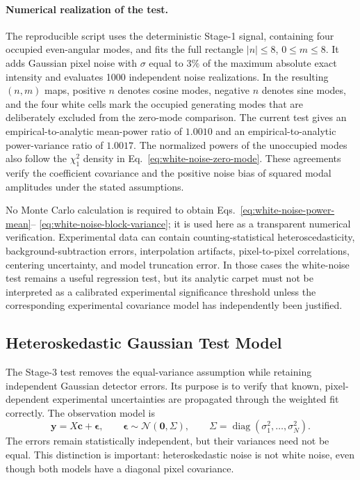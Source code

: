 \documentclass[aps,prb,preprint,onecolumn,notitlepage,amsmath,amssymb,
  superscriptaddress,floatfix]{revtex4-2}
\begin{document}
\paragraph{Numerical realization of the test.}
The reproducible script
 uses the deterministic
Stage-1 signal, containing four occupied even-angular modes, and fits the full
rectangle $|n|\leq8$, $0\leq m\leq8$.  It adds Gaussian pixel noise with
$\sigma$ equal to $3\%$ of the maximum absolute exact intensity and evaluates
1000 independent noise realizations.  In the resulting $(n,m)$ maps, positive
$n$ denotes cosine modes, negative $n$ denotes sine modes, and the four white
cells mark the occupied generating modes that are deliberately excluded from
the zero-mode comparison.  The current test gives an empirical-to-analytic
mean-power ratio of $1.0010$ and an empirical-to-analytic power-variance ratio
of $1.0017$.  The normalized powers of the unoccupied modes also follow the
$\chi_1^2$ density in Eq.~\eqref{eq:white-noise-zero-mode}.  These agreements
verify the coefficient covariance and the positive noise bias of squared
modal amplitudes under the stated assumptions.

No Monte Carlo calculation is required to obtain Eqs.~\eqref{eq:white-noise-power-mean}--
\eqref{eq:white-noise-block-variance}; it is used here as a transparent
numerical verification.  Experimental data can contain counting-statistical
heteroscedasticity, background-subtraction errors, interpolation artifacts,
pixel-to-pixel correlations, centering uncertainty, and model truncation
error.  In those cases the white-noise test remains a useful regression test,
but its analytic carpet must not be interpreted as a calibrated experimental
significance threshold unless the corresponding experimental covariance
model has independently been justified.

\subsection{Heteroskedastic Gaussian Test Model}

The Stage-3 test removes the equal-variance assumption while retaining
independent Gaussian detector errors.  Its purpose is to verify that known,
pixel-dependent experimental uncertainties are propagated through the
weighted fit correctly.  The observation model is
\begin{equation}
 \bm y=X\bm c+\bm\epsilon,
 \qquad
 \bm\epsilon\sim\mathcal{N}(\bm0,\Sigma),
 \qquad
 \Sigma=\operatorname{diag}(\sigma_1^2,\ldots,\sigma_N^2).
 \label{eq:heteroskedastic-model}
\end{equation}
The errors remain statistically independent, but their variances need not be
equal.  This distinction is important: heteroskedastic noise is not white
noise, even though both models have a diagonal pixel covariance.
\end{document}
